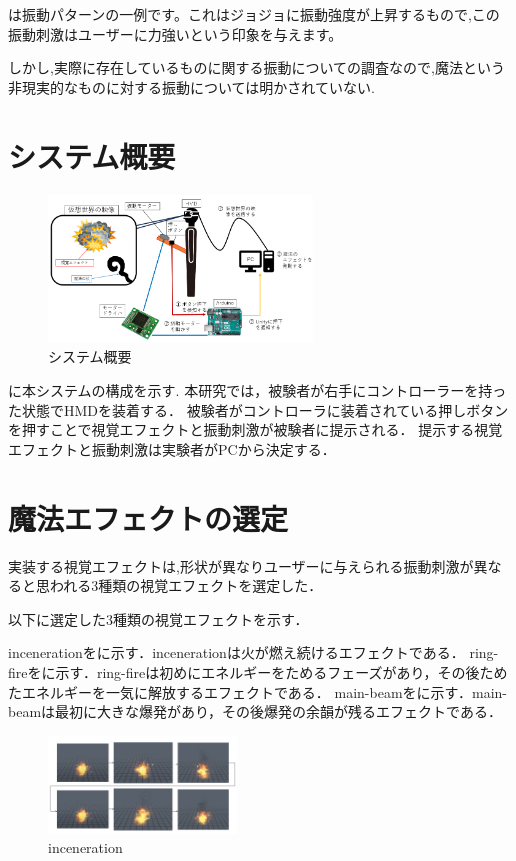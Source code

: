 \documentclass[uplatex]{jsarticle}   %
\begin{document}
は振動パターンの一例です。これはジョジョに振動強度が上昇するもので,この振動刺激はユーザーに力強いという印象を与えます。

しかし,実際に存在しているものに関する振動についての調査なので,魔法という非現実的なものに対する振動については明かされていない.


\section{システム概要}
\begin{figure}[b]
\centering
\includegraphics[clip,width=7cm]{fig/systemkousei.png}
\caption{システム概要}\label{system}
\end{figure}

に本システムの構成を示す.
本研究では，被験者が右手にコントローラーを持った状態でHMDを装着する．
被験者がコントローラに装着されている押しボタンを押すことで視覚エフェクトと振動刺激が被験者に提示される．
提示する視覚エフェクトと振動刺激は実験者がPCから決定する．

\section{魔法エフェクトの選定}
実装する視覚エフェクトは,形状が異なりユーザーに与えられる振動刺激が異なると思われる3種類の視覚エフェクトを選定した．

以下に選定した3種類の視覚エフェクトを示す．

incenerationをに示す．incenerationは火が燃え続けるエフェクトである．
ring-fireをに示す．ring-fireは初めにエネルギーをためるフェーズがあり，その後ためたエネルギーを一気に解放するエフェクトである．
main-beamをに示す．main-beamは最初に大きな爆発があり，その後爆発の余韻が残るエフェクトである．

\begin{figure}[h]
\centering
\includegraphics[clip,width=5cm]{fig/fireTime.png}
\caption{inceneration}\label{fire}
\end{figure}
\end{document}
